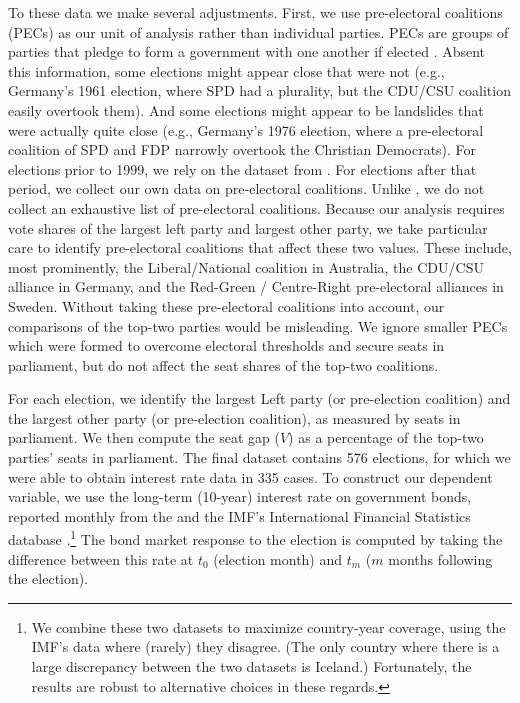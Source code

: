 \documentclass[12pt]{article}
\begin{document}
To these data we make several adjustments. First, we use pre-electoral coalitions (PECs) as our unit of analysis rather than individual parties. PECs are groups of parties that pledge to form a government with one another if elected \citep{Golder2006}. Absent this information, some elections might appear close that were not (e.g., Germany's 1961 election, where SPD had a plurality, but the CDU/CSU coalition easily overtook them). And some elections might appear to be landslides that were actually quite close (e.g., Germany's 1976 election, where a pre-electoral coalition of SPD and FDP narrowly overtook the Christian Democrats). For elections prior to 1999, we rely on the dataset from \citet{Golder2006}. For elections after that period, we collect our own data on pre-electoral coalitions. Unlike \citet{Golder2006}, we do not collect an exhaustive list of pre-electoral coalitions. Because our analysis requires vote shares of the largest left party and largest other party, we take particular care to identify pre-electoral coalitions that affect these two values. These include, most prominently, the Liberal/National coalition in Australia, the CDU/CSU alliance in Germany, and the Red-Green / Centre-Right pre-electoral alliances in Sweden. Without taking these pre-electoral coalitions into account, our comparisons of the top-two parties would be misleading. We ignore smaller PECs which were formed to overcome electoral thresholds and secure seats in parliament, but do not affect the seat shares of the top-two coalitions. 

For each election, we identify the largest Left party (or pre-election coalition) and the largest other party (or pre-election coalition), as measured by seats in parliament. We then compute the seat gap ($V$) as a percentage of the top-two parties' seats in parliament. The final dataset contains 576 elections, for which we were able to obtain interest rate data in 335 cases. To construct our dependent variable, we use the long-term (10-year) interest rate on government bonds, reported monthly from the \citet{OECD2018} and the IMF's International Financial Statistics database \citep{IMF2018}.\footnote{We combine these two datasets to maximize country-year coverage, using the IMF's data where (rarely) they disagree. (The only country where there is a large discrepancy between the two datasets is Iceland.) Fortunately, the results are robust to alternative choices in these regards.} The bond market response to the election is computed by taking the difference between this rate at $t_0$ (election month) and $t_m$ ($m$ months following the election).
\end{document}
